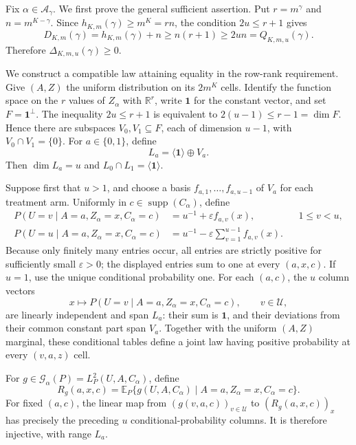 Fix \(\alpha\in\mathcal A_\gamma\). We first prove the general sufficient assertion. Put \(r=m^\gamma\) and \(n=m^{K-\gamma}\). Since \(h_{K,m}(\gamma)\ge m^K=rn\), the condition \(2u\le r+1\) gives
\[D_{K,m}(\gamma)=h_{K,m}(\gamma)+n\ge n(r+1)\ge2un=Q_{K,m,u}(\gamma).\]
Therefore \(\Delta_{K,m,u}(\gamma)\ge0\).

We construct a compatible law attaining equality in the row-rank requirement. Give \((A,Z)\) the uniform distribution on its \(2m^K\) cells. Identify the function space on the \(r\) values of \(Z_\alpha\) with \(\mathbb R^r\), write \(\mathbf 1\) for the constant vector, and set \(F=\mathbf 1^\perp\). The inequality \(2u\le r+1\) is equivalent to \(2(u-1)\le r-1=\dim F\). Hence there are subspaces \(V_0,V_1\subseteq F\), each of dimension \(u-1\), with \(V_0\cap V_1=\{0\}\). For \(a\in\{0,1\}\), define
\[L_a=\langle\mathbf 1\rangle\oplus V_a.\]
Then \(\dim L_a=u\) and \(L_0\cap L_1=\langle\mathbf 1\rangle\).

Suppose first that \(u>1\), and choose a basis \(f_{a,1},\ldots,f_{a,u-1}\) of \(V_a\) for each treatment arm. Uniformly in \(c\in\operatorname{supp}(C_\alpha)\), define
\[\begin{aligned}P(U=v\mid A=a,Z_\alpha=x,C_\alpha=c)&=u^{-1}+\varepsilon f_{a,v}(x),&&1\le v<u,\\P(U=u\mid A=a,Z_\alpha=x,C_\alpha=c)&=u^{-1}-\varepsilon\sum_{v=1}^{u-1}f_{a,v}(x).\end{aligned}\]
Because only finitely many entries occur, all entries are strictly positive for sufficiently small \(\varepsilon>0\); the displayed entries sum to one at every \((a,x,c)\). If \(u=1\), use the unique conditional probability one. For each \((a,c)\), the \(u\) column vectors
\[x\longmapsto P(U=v\mid A=a,Z_\alpha=x,C_\alpha=c),\qquad v\in\mathcal U,\]
are linearly independent and span \(L_a\): their sum is \(\mathbf 1\), and their deviations from their common constant part span \(V_a\). Together with the uniform \((A,Z)\) marginal, these conditional tables define a joint law having positive probability at every \((v,a,z)\) cell.

For \(g\in\mathcal G_\alpha(P)=L_P^2(U,A,C_\alpha)\), define
\[R_g(a,x,c)=\mathbb E_P\{g(U,A,C_\alpha)\mid A=a,Z_\alpha=x,C_\alpha=c\}.\]
For fixed \((a,c)\), the linear map from \((g(v,a,c))_{v\in\mathcal U}\) to \((R_g(a,x,c))_x\) has precisely the preceding \(u\) conditional-probability columns. It is therefore injective, with range \(L_a\).

